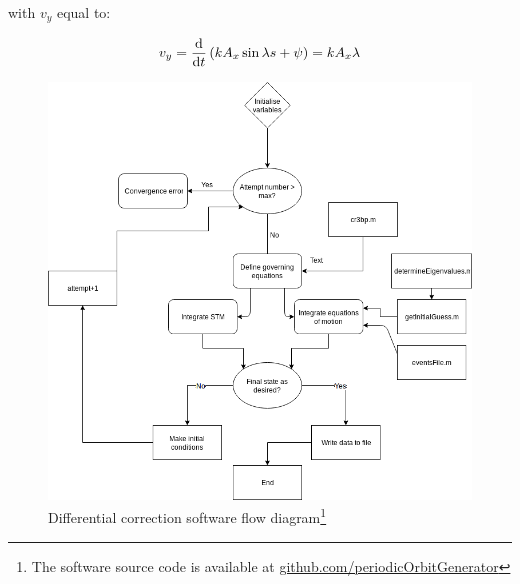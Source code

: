 \noindent with $v_y$ equal to:

\begin{equation}
	v_y = \frac{\textnormal{d}}{\textnormal{d}t} \left(kA_x\sin{\lambda s + \psi}\right) = kA_x\lambda
\end{equation}


\begin{figure}
\centering
\includegraphics[height=.4\textheight]{figures/differentialCorrectorFlow}
\caption{Differential correction software flow diagram\footnote{The software source code is available at \url{github.com/periodicOrbitGenerator}}}
\label{f:differentialcorrectorflow}
\end{figure}